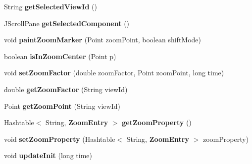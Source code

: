\begin{DoxyCompactItemize}
\item 
String {\bfseries get\-Selected\-View\-Id} ()\label{classdesmoj_1_1extensions_1_1visualization2d_1_1engine_1_1model_grafic_1_1_model_grafic_a48c9294fcd95803a60b453eee8fe2e86}

\item 
J\-Scroll\-Pane {\bfseries get\-Selected\-Component} ()\label{classdesmoj_1_1extensions_1_1visualization2d_1_1engine_1_1model_grafic_1_1_model_grafic_a83e0da9bb9edc56990700263724aea97}

\item 
void {\bfseries paint\-Zoom\-Marker} (Point zoom\-Point, boolean shift\-Mode)\label{classdesmoj_1_1extensions_1_1visualization2d_1_1engine_1_1model_grafic_1_1_model_grafic_a26be9ede764f893eea042683121c7322}

\item 
boolean {\bfseries is\-In\-Zoom\-Center} (Point p)\label{classdesmoj_1_1extensions_1_1visualization2d_1_1engine_1_1model_grafic_1_1_model_grafic_a7fc72f70a5c28cc742eb66473a1d41f1}

\item 
void {\bfseries set\-Zoom\-Factor} (double zoom\-Factor, Point zoom\-Point, long time)\label{classdesmoj_1_1extensions_1_1visualization2d_1_1engine_1_1model_grafic_1_1_model_grafic_a55edaf6e320419bcea0d286b6c06ac21}

\item 
double {\bfseries get\-Zoom\-Factor} (String view\-Id)\label{classdesmoj_1_1extensions_1_1visualization2d_1_1engine_1_1model_grafic_1_1_model_grafic_a6551b204ae4d2f8d520ed21d3d900f95}

\item 
Point {\bfseries get\-Zoom\-Point} (String view\-Id)\label{classdesmoj_1_1extensions_1_1visualization2d_1_1engine_1_1model_grafic_1_1_model_grafic_a45a367a63db4b4d38db5a137a773029b}

\item 
Hashtable$<$ String, {\bf Zoom\-Entry} $>$ {\bfseries get\-Zoom\-Property} ()\label{classdesmoj_1_1extensions_1_1visualization2d_1_1engine_1_1model_grafic_1_1_model_grafic_a0fa1dcbdf4f235a6c8222979f915c013}

\item 
void {\bfseries set\-Zoom\-Property} (Hashtable$<$ String, {\bf Zoom\-Entry} $>$ zoom\-Property)\label{classdesmoj_1_1extensions_1_1visualization2d_1_1engine_1_1model_grafic_1_1_model_grafic_a3fbb0ea12893c5c9cc380736b5fe1059}

\item 
void {\bfseries update\-Init} (long time)\label{classdesmoj_1_1extensions_1_1visualization2d_1_1engine_1_1model_grafic_1_1_model_grafic_adea684e8107b635af9981bcb5e5b5434}


\end{DoxyCompactItemize}
